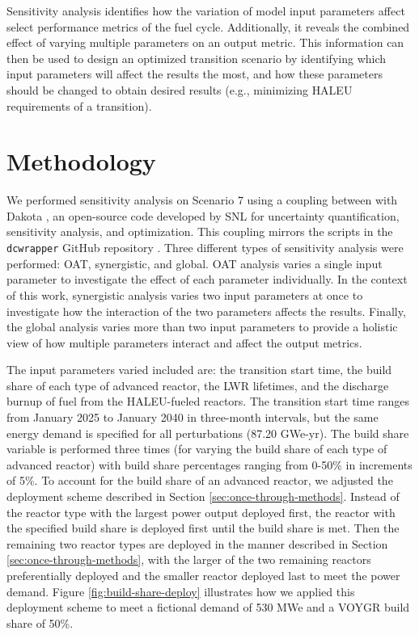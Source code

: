 Sensitivity analysis identifies how the variation of model input
parameters affect select performance 
metrics of the fuel cycle. Additionally, it reveals the combined effect 
of varying multiple parameters on 
an output metric. This information can then be used to design 
an optimized transition scenario by identifying which input parameters 
will affect the results the most, and how these parameters should be 
changed to obtain desired results (e.g., minimizing \gls{HALEU} requirements
of a transition). 

\section{Methodology}
We performed sensitivity analysis on Scenario 7 using a coupling 
between \Cyclus with Dakota \cite{adams_dakota_2021}, an 
open-source code developed by \gls{SNL} for uncertainty quantification, 
sensitivity analysis, and optimization. This coupling mirrors  
the scripts in the \texttt{dcwrapper} GitHub repository 
\cite{chee_arfcdcwrapper_2019}. Three different types 
of sensitivity analysis were performed: \acrfull{OAT}, synergistic, 
and global. \gls{OAT} analysis varies a single input parameter to 
investigate the effect of each parameter individually. In the context of 
this work, synergistic 
analysis varies two input parameters at once to investigate how the 
interaction of the two parameters affects the results. Finally, the global 
analysis varies more than two input parameters to provide a holistic 
view of how multiple parameters interact and affect the output metrics. 

The input parameters varied included are: the transition 
start time, the build share of each type of advanced reactor, 
the \gls{LWR} lifetimes, and the discharge burnup of fuel from the 
\gls{HALEU}-fueled reactors. The transition start time ranges from January 
2025 to January 2040 in three-month intervals, but the same energy demand 
is specified for all perturbations (87.20 GWe-yr). The build share 
variable is performed three times (for varying the build share of each 
type of advanced reactor) with build share percentages ranging from 0-50\% 
in increments of 5\%. To account for the build share of an advanced reactor,
we adjusted the deployment scheme described in Section \ref{sec:once-through-methods}.
Instead of the reactor type with the largest power output 
deployed first, the reactor with the specified build share is deployed first 
until the build share is met. Then the remaining two reactor types are 
deployed in the manner described in Section \ref{sec:once-through-methods},
with the larger of the two remaining reactors preferentially deployed and 
the smaller reactor deployed last to meet the power demand. Figure 
\ref{fig:build-share-deploy} illustrates how we applied this deployment 
scheme to meet a fictional demand of 530 MWe and a VOYGR build share of 
50\%. 

